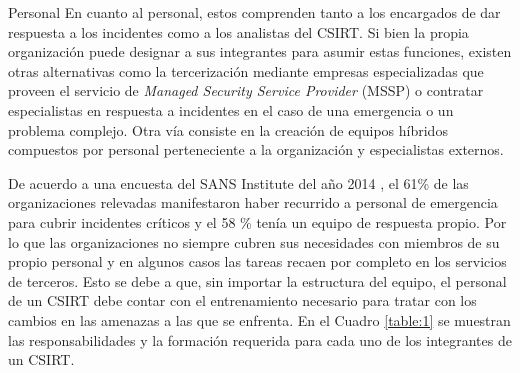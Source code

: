    \begin{section}{Personal}  
   En cuanto al personal, estos comprenden tanto a los encargados de dar respuesta a los incidentes como a los analistas del CSIRT. Si bien la propia organización puede designar a sus integrantes para asumir estas funciones, existen otras alternativas como la tercerización mediante empresas especializadas que proveen el servicio de \textit{Managed Security Service Provider} (MSSP) o contratar especialistas en respuesta a incidentes en el caso de una emergencia o un problema complejo. Otra vía consiste en la creación de equipos híbridos compuestos por personal perteneciente a la organización y especialistas externos. \par
    De acuerdo a una encuesta del SANS Institute del año 2014 \cite{sans_1}, el 61\% de las organizaciones relevadas manifestaron haber recurrido a personal de emergencia para cubrir incidentes críticos y el 58 \% tenía un equipo de respuesta propio. Por lo que las organizaciones no siempre cubren sus necesidades con miembros de su propio personal y en algunos casos las tareas recaen por completo en los servicios de terceros. Esto se debe a que, sin importar la estructura del equipo, el personal de un CSIRT debe contar con el entrenamiento necesario para tratar con los cambios en las amenazas a las que se enfrenta. En el Cuadro \ref{table:1} se muestran las responsabilidades y la formación requerida para cada uno de los integrantes de un CSIRT. \par
    

\end{section}
